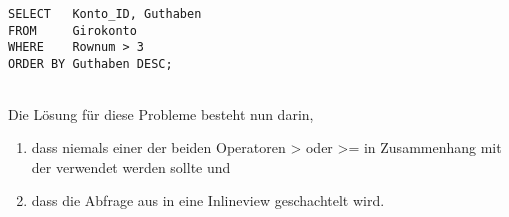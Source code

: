           \begin{lstlisting}[language=oracle_sql,caption={Erneut eine falsche Anwendung der Rownum},label=sql06_13]
SELECT   Konto_ID, Guthaben
FROM     Girokonto
WHERE    Rownum > 3
ORDER BY Guthaben DESC;
          \end{lstlisting}
          \begin{center}
            \begin{small}
              \tablehead{}

              \begin{oraclesql}
                \begin{supertabular}{rr}

                \end{supertabular}
              \end{oraclesql}
            \end{small}
          \end{center}
          Die L\"osung f\"ur diese Probleme besteht nun darin,
          \begin{enumerate}
            \item dass niemals einer der beiden Operatoren \textgreater{} oder \textgreater = in Zusammenhang mit der  verwendet werden sollte und
            \item dass die Abfrage aus  in eine Inlineview geschachtelt wird.
          \end{enumerate}
